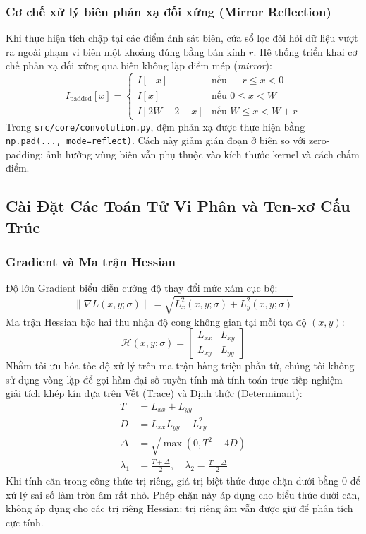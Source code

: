 \documentclass[conference]{IEEEtran}
\begin{document}
\subsubsection{Cơ chế xử lý biên phản xạ đối xứng (Mirror Reflection)}
Khi thực hiện tích chập tại các điểm ảnh sát biên, cửa sổ lọc đòi hỏi dữ liệu vượt ra ngoài phạm vi biên một khoảng đúng bằng bán kính $r$. Hệ thống triển khai cơ chế phản xạ đối xứng qua biên không lặp điểm mép (\textit{mirror}):
\begin{equation}
I_{\text{padded}}[x] = \begin{cases}
I[-x] & \text{nếu } -r \le x < 0 \\
I[x] & \text{nếu } 0 \le x < W \\
I[2W - 2 - x] & \text{nếu } W \le x < W + r
\end{cases}
\end{equation}
Trong \texttt{src/core/convolution.py}, đệm phản xạ được thực hiện bằng \texttt{np.pad(..., mode=reflect)}. Cách này giảm gián đoạn ở biên so với zero-padding; ảnh hưởng vùng biên vẫn phụ thuộc vào kích thước kernel và cách chấm điểm.

\subsection{Cài Đặt Các Toán Tử Vi Phân và Ten-xơ Cấu Trúc}
\subsubsection{Gradient và Ma trận Hessian}
Độ lớn Gradient biểu diễn cường độ thay đổi mức xám cục bộ:
\begin{equation}
\|\nabla L(x, y; \sigma)\| = \sqrt{L_x^2(x, y; \sigma) + L_y^2(x, y; \sigma)}
\end{equation}
Ma trận Hessian bậc hai thu nhận độ cong không gian tại mỗi tọa độ $(x, y)$:
\begin{equation}
\mathcal{H}(x, y; \sigma) = \begin{bmatrix} L_{xx} & L_{xy} \\ L_{xy} & L_{yy} \end{bmatrix}
\end{equation}
Nhằm tối ưu hóa tốc độ xử lý trên ma trận hàng triệu phần tử, chúng tôi không sử dụng vòng lặp để gọi hàm đại số tuyến tính mà tính toán trực tiếp nghiệm giải tích khép kín dựa trên Vết (Trace) và Định thức (Determinant):
\begin{align}
T &= L_{xx} + L_{yy} \\
D &= L_{xx} L_{yy} - L_{xy}^2 \\
\Delta &= \sqrt{\max(0, T^2 - 4D)} \\
\lambda_1 &= \frac{T + \Delta}{2}, \quad \lambda_2 = \frac{T - \Delta}{2}
\end{align}
Khi tính căn trong công thức trị riêng, giá trị biệt thức được chặn dưới bằng 0 để xử lý sai số làm tròn âm rất nhỏ. Phép chặn này áp dụng cho biểu thức dưới căn, không áp dụng cho các trị riêng Hessian: trị riêng âm vẫn được giữ để phân tích cực tính.
\end{document}

